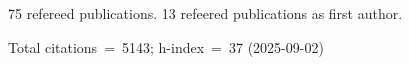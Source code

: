 75 refereed publications. 13 refeered publications as first author.

Total citations~=~5143; h-index~=~37 (2025-09-02)